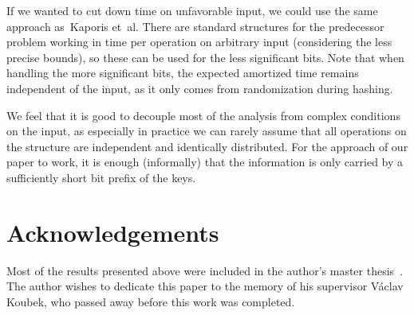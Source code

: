 \documentclass[
submission
, nomarks
]{dmtcs-episciences}
\theoremstyle{plain}
\theoremstyle{definition}
\theoremstyle{remark}
\theoremstyle{plain}
\theoremstyle{plain}
\begin{document}
If we wanted to cut down time on unfavorable input, we could use the
same approach as~Kaporis et~al. There are standard structures for
the predecessor problem working in time 
per operation on arbitrary input (considering the less precise bounds),
so these can be used for the less significant bits. Note that when
handling the more significant bits, the expected amortized time 
remains independent of the input, as it only comes from randomization
during hashing.

We feel that it is good to decouple most of the analysis from complex
conditions on the input, as especially in practice we can rarely assume
that all operations on the structure are independent and identically
distributed. For the approach of our paper to work, it is enough (informally)
that the information is only carried by a sufficiently short bit prefix
of the keys.

\section*{Acknowledgements}

Most of the results presented above were included in the author's master thesis~\cite{Cunat10}. The author wishes to dedicate this paper to the memory of his supervisor V\'aclav Koubek, who passed away before this work was completed.


 
\end{document}
